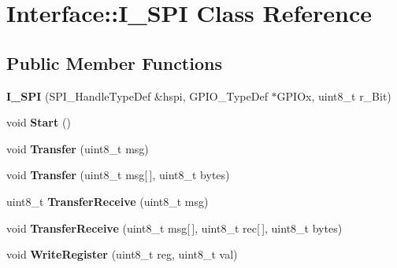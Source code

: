 \hypertarget{class_interface_1_1_i___s_p_i}{}\section{Interface\+::I\+\_\+\+S\+PI Class Reference}
\label{class_interface_1_1_i___s_p_i}
\subsection*{Public Member Functions}
\begin{DoxyCompactItemize}
\item 
\mbox{\label{class_interface_1_1_i___s_p_i_ab925fd980267faf9d2c96d24e4f0d5bd}} 
{\bfseries I\+\_\+\+S\+PI} (S\+P\+I\+\_\+\+Handle\+Type\+Def \&hspi, G\+P\+I\+O\+\_\+\+Type\+Def $\ast$G\+P\+I\+Ox, uint8\+\_\+t r\+\_\+\+Bit)
\item 
\mbox{\label{class_interface_1_1_i___s_p_i_a876689bfd573068d6e44ce24e3672b35}} 
void {\bfseries Start} ()
\item 
\mbox{\label{class_interface_1_1_i___s_p_i_af345850e3e9d67d1f5bddfc6cc755c32}} 
void {\bfseries Transfer} (uint8\+\_\+t msg)
\item 
\mbox{\label{class_interface_1_1_i___s_p_i_a6d800ecd87b0ac920f5c650c8ddbad30}} 
void {\bfseries Transfer} (uint8\+\_\+t msg\mbox{[}$\,$\mbox{]}, uint8\+\_\+t bytes)
\item 
\mbox{\label{class_interface_1_1_i___s_p_i_ab94e196b8b8a7de032d0a8cbe34590b9}} 
uint8\+\_\+t {\bfseries Transfer\+Receive} (uint8\+\_\+t msg)
\item 
\mbox{\label{class_interface_1_1_i___s_p_i_a2a5d262b609429383ad0125174f91cd8}} 
void {\bfseries Transfer\+Receive} (uint8\+\_\+t msg\mbox{[}$\,$\mbox{]}, uint8\+\_\+t rec\mbox{[}$\,$\mbox{]}, uint8\+\_\+t bytes)
\item 
\mbox{\label{class_interface_1_1_i___s_p_i_af293dff982a82316809ad09732557540}} 
void {\bfseries Write\+Register} (uint8\+\_\+t reg, uint8\+\_\+t val)
\item 

\end{DoxyCompactItemize}
